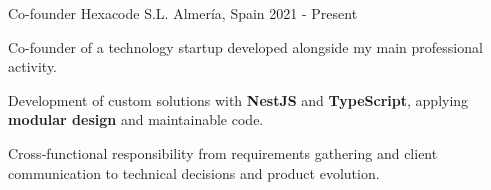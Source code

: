  \cventry
    {Co-founder}
    {Hexacode S.L.}
  {Almería, Spain}
  {2021 - Present}
  {
    \begin{cvitems}
      \item {Co-founder of a technology startup developed alongside my main professional activity.}
      \item {Development of custom solutions with \textbf{NestJS} and \textbf{TypeScript}, applying \textbf{modular design} and maintainable code.}
      \item {Cross-functional responsibility from requirements gathering and client communication to technical decisions and product evolution.}
    \end{cvitems}
  }
